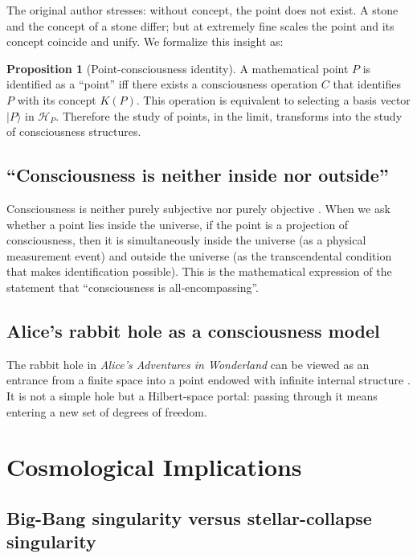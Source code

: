\documentclass[11pt,a4paper]{article}
\theoremstyle{definition}
\newtheorem{proposition}{Proposition}
\begin{document}
The original author stresses: without concept, the point does not exist. A stone and the concept of a stone differ; but at extremely fine scales the point and its concept coincide and unify. We formalize this insight as:

\begin{proposition}[Point-consciousness identity]
A mathematical point $P$ is identified as a ``point'' iff there exists a consciousness operation $C$ that identifies $P$ with its concept $K(P)$. This operation is equivalent to selecting a basis vector $|P\rangle$ in $\mathcal{H}_P$. Therefore the study of points, in the limit, transforms into the study of consciousness structures.
\end{proposition}

\subsection{``Consciousness is neither inside nor outside''}

Consciousness is neither purely subjective nor purely objective \cite{chalmers1995}. When we ask whether a point lies inside the universe, if the point is a projection of consciousness, then it is simultaneously inside the universe (as a physical measurement event) and outside the universe (as the transcendental condition that makes identification possible). This is the mathematical expression of the statement that ``consciousness is all-encompassing''.

\subsection{Alice's rabbit hole as a consciousness model}

The rabbit hole in \textit{Alice's Adventures in Wonderland} can be viewed as an entrance from a finite space into a point endowed with infinite internal structure \cite{carroll1865}. It is not a simple hole but a Hilbert-space portal: passing through it means entering a new set of degrees of freedom.

\section{Cosmological Implications}

\subsection{Big-Bang singularity versus stellar-collapse singularity}
\end{document}
